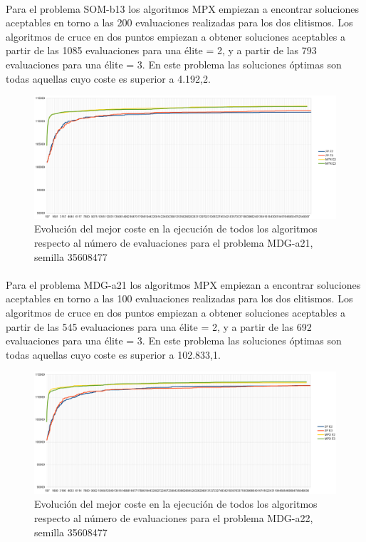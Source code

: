 	\paragraph{}Para el problema SOM-b13 los algoritmos MPX empiezan a encontrar soluciones aceptables en torno a las 200 evaluaciones realizadas para los dos elitismos. Los algoritmos de cruce en dos puntos empiezan a obtener soluciones aceptables a partir de las 1085 evaluaciones para una élite = 2, y a partir de las 793 evaluaciones para una élite = 3. En este problema las soluciones óptimas son todas aquellas cuyo coste es superior a 4.192,2.

	\begin{figure}[H]
		\centering
		\includegraphics[scale=0.3]{img/35608477_MDG-a_21_n2000_m200.png}
		\caption{Evolución del mejor coste en la ejecución de todos los algoritmos respecto al número de evaluaciones para el problema MDG-a21, semilla 35608477}
		\label{MDG-a_21_historico}
	\end{figure}

	\paragraph{}Para el problema MDG-a21 los algoritmos MPX empiezan a encontrar soluciones aceptables en torno a las 100 evaluaciones realizadas para los dos elitismos. Los algoritmos de cruce en dos puntos empiezan a obtener soluciones aceptables a partir de las 545 evaluaciones para una élite = 2, y a partir de las 692 evaluaciones para una élite = 3. En este problema las soluciones óptimas son todas aquellas cuyo coste es superior a 102.833,1.
	
	\begin{figure}[H]
		\centering
		\includegraphics[scale=0.3]{img/35608477_MDG-a_22_n2000_m200.png}
		\caption{Evolución del mejor coste en la ejecución de todos los algoritmos respecto al número de evaluaciones para el problema MDG-a22, semilla 35608477}
		\label{MDG-a_22_historico}
	\end{figure}

